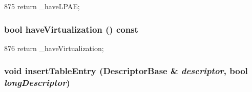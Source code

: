 \begin{DoxyCode}
875 { return _haveLPAE; }
\end{DoxyCode}
\hypertarget{classArmISA_1_1TableWalker_afef641e959fe33dee8702b9bb5e1b9e4}{
\subsubsection[{haveVirtualization}]{\setlength{\rightskip}{0pt plus 5cm}bool haveVirtualization () const}}
\label{classArmISA_1_1TableWalker_afef641e959fe33dee8702b9bb5e1b9e4}



\begin{DoxyCode}
876 { return _haveVirtualization; }
\end{DoxyCode}
\hypertarget{classArmISA_1_1TableWalker_aad13c1fc4ab80d03d2af5ac43f41be23}{
\subsubsection[{insertTableEntry}]{\setlength{\rightskip}{0pt plus 5cm}void insertTableEntry ({\bf DescriptorBase} \& {\em descriptor}, \/  bool {\em longDescriptor})}}
\label{classArmISA_1_1TableWalker_aad13c1fc4ab80d03d2af5ac43f41be23}



